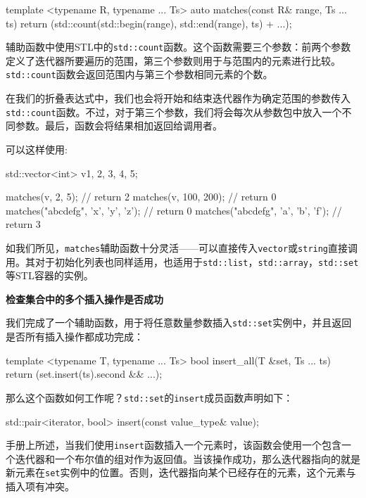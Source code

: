 \begin{codebox}[cpp]
template <typename R, typename ... Ts>
auto matches(const R& range, Ts ... ts)
{
    return (std::count(std::begin(range), std::end(range), ts) + ...);
}
\end{codebox}

辅助函数中使用STL中的\texttt{std::count}函数。这个函数需要三个参数：前两个参数定义了迭代器所要遍历的范围，第三个参数则用于与范围内的元素进行比较。\texttt{std::count}函数会返回范围内与第三个参数相同元素的个数。

在我们的折叠表达式中，我们也会将开始和结束迭代器作为确定范围的参数传入\texttt{std::count}函数。不过，对于第三个参数，我们将会每次从参数包中放入一个不同参数。最后，函数会将结果相加返回给调用者。

可以这样使用:

\begin{codebox}[cpp]
std::vector<int> v{1, 2, 3, 4, 5};

matches(v, 2, 5); // return 2
matches(v, 100, 200); // return 0
matches("abcdefg", 'x', 'y', 'z'); // return 0
matches("abcdefg", 'a', 'b', 'f'); // return 3
\end{codebox}

如我们所见，\texttt{matches}辅助函数十分灵活——可以直接传入\texttt{vector}或\texttt{string}直接调用。其对于初始化列表也同样适用，也适用于\texttt{std::list}，\texttt{std::array}，\texttt{std::set}等STL容器的实例。

\textbf{检查集合中的多个插入操作是否成功}

我们完成了一个辅助函数，用于将任意数量参数插入\texttt{std::set}实例中，并且返回是否所有插入操作都成功完成：

\begin{codebox}[cpp]
template <typename T, typename ... Ts>
bool insert_all(T &set, Ts ... ts)
{
    return (set.insert(ts).second && ...);
}
\end{codebox}

那么这个函数如何工作呢？\texttt{std::set}的\texttt{insert}成员函数声明如下：

\begin{codebox}[cpp]
std::pair<iterator, bool> insert(const value_type& value);
\end{codebox}

手册上所述，当我们使用\texttt{insert}函数插入一个元素时，该函数会使用一个包含一个迭代器和一个布尔值的组对作为返回值。当该操作成功，那么迭代器指向的就是新元素在\texttt{set}实例中的位置。否则，迭代器指向某个已经存在的元素，这个元素与插入项有冲突。

